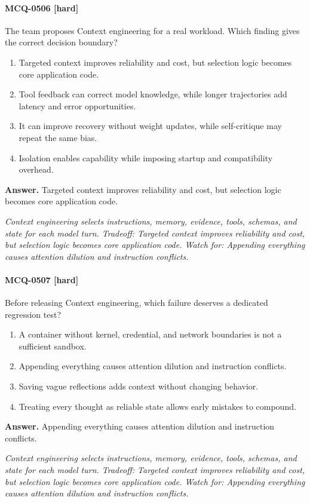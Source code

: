 \paragraph{MCQ-0506 [hard]} The team proposes Context engineering for a real workload. Which finding gives the correct decision boundary?
\begin{enumerate}[label=\Alph*.]
\item Targeted context improves reliability and cost, but selection logic becomes core application code.
\item Tool feedback can correct model knowledge, while longer trajectories add latency and error opportunities.
\item It can improve recovery without weight updates, while self-critique may repeat the same bias.
\item Isolation enables capability while imposing startup and compatibility overhead.
\end{enumerate}
\noindent\textbf{Answer.} Targeted context improves reliability and cost, but selection logic becomes core application code.
\par\textit{Context engineering selects instructions, memory, evidence, tools, schemas, and state for each model turn. Tradeoff: Targeted context improves reliability and cost, but selection logic becomes core application code. Watch for: Appending everything causes attention dilution and instruction conflicts.}
\paragraph{MCQ-0507 [hard]} Before releasing Context engineering, which failure deserves a dedicated regression test?
\begin{enumerate}[label=\Alph*.]
\item A container without kernel, credential, and network boundaries is not a sufficient sandbox.
\item Appending everything causes attention dilution and instruction conflicts.
\item Saving vague reflections adds context without changing behavior.
\item Treating every thought as reliable state allows early mistakes to compound.
\end{enumerate}
\noindent\textbf{Answer.} Appending everything causes attention dilution and instruction conflicts.
\par\textit{Context engineering selects instructions, memory, evidence, tools, schemas, and state for each model turn. Tradeoff: Targeted context improves reliability and cost, but selection logic becomes core application code. Watch for: Appending everything causes attention dilution and instruction conflicts.}
